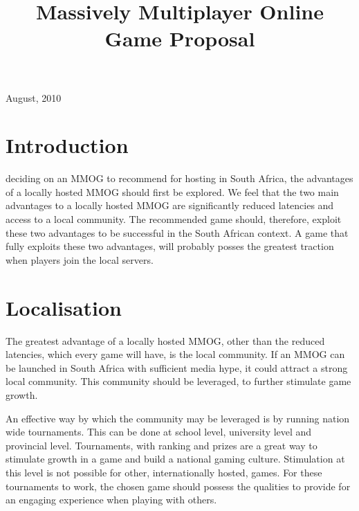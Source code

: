 \documentclass[journal,oneside,a4paper,onecolumn]{IEEEtran}
\begin{document}
%
\title{Massively Multiplayer Online Game Proposal}

\author{
}

\maketitle

\hfill August, 2010

\section{Introduction}


 deciding on an \ac{MMOG} to recommend for hosting in South Africa, the advantages of a locally hosted \ac{MMOG} should first be
explored. We feel that the two main advantages to a locally hosted \ac{MMOG} are significantly reduced latencies and access to a local community. The
recommended game should, therefore, exploit these two advantages to be successful in the South African context. A game that fully exploits these two
advantages, will probably posses the greatest traction when players join the local servers.

\section{Localisation}

The greatest advantage of a locally hosted MMOG, other than the reduced latencies, which every game will have, is the local community. If an MMOG can
be launched in South Africa with sufficient media hype, it could attract a strong local community. This community should be leveraged, to further
stimulate game growth.

An effective way by which the community may be leveraged is by running nation wide tournaments. This can be done at school level, university level
and provincial level. Tournaments, with ranking and prizes are a great way to stimulate growth in a game and build a national gaming culture.
Stimulation at this level is not possible for other, internationally hosted, games. For these tournaments to work, the chosen game should possess the
qualities to provide for an engaging experience when playing with others.
\end{document}
